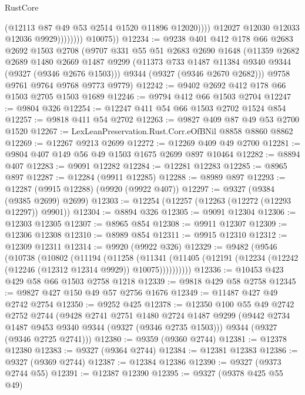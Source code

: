 \begin{lexlean}{RustCore}
\begin{coremodule}
                              (@12113 @87 @49 @53 @2514 @1520 @11896 @12020))))
                        @12027
                        @12030
                        @12033
                        @12036
                        @9929))))))))
        @10075))
@12234 := @9238
    @401
    @412
    @178
    @66
    @2683
    @2692
    @1503
    @2708
    (@9707
      @331
      @55
      @51
      @2683
      @2690
      @1648
      (@11359
        @2682
        @2689
        @1480
        @2669
        @1487
        @9299
        (@11373 @733 @1487 @11384 @9340 @9344 (@9327 (@9346 @2676 @1503)))
        @9344
        (@9327 (@9346 @2670 @2682)))
      @9758
      @9761
      @9764
      @9768
      @9773
      @9779)
@12242 := @9402 @2692 @412 @178 @66 @1503 @2705 @1503 @1689
@12246 := @9794 @412 @66 @1503 @2704
@12247 := @9804 @326
@12254 := @12247 @411 @54 @66 @1503 @2702 @1524 @854
@12257 := @9818 @411 @54 @2702
@12263 := @9827 @409 @87 @49 @53 @2700 @1520
@12267 := LexLeanPreservation.Rust.Corr.eOfBNil @8858 @8860 @8862
@12269 := @12267 @9213 @2699
@12272 := @12269 @409 @49 @2700
@12281 := @9804 @407 @149 @56 @49 @1503 @1675 @2699 @897 @10464
@12282 := @8894 @407
@12283 := @9091 @12282
@12284 := @12281 @12283
@12285 := @8965 @897
@12287 := @12284 (@9911 @12285)
@12288 := @8989 @897
@12293 := @12287 (@9915 @12288) (@9920 (@9922 @407))
@12297 := @9327 (@9384 (@9385 @2699) @2699)
@12303 := @12254 (@12257 (@12263 (@12272 (@12293 @12297)) @9901))
@12304 := @8894 @326
@12305 := @9091 @12304
@12306 := @12303 @12305
@12307 := @8965 @854
@12308 := @9911 @12307
@12309 := @12306 @12308
@12310 := @8989 @854
@12311 := @9915 @12310
@12312 := @12309 @12311
@12314 := @9920 (@9922 @326)
@12329 := @9482
    (@9546
      (@10738
        (@10802
          (@11194
            (@11258
              (@11341
                (@11405 (@12191 (@12234 (@12242 (@12246 (@12312 @12314 @9929)) @10075))))))))))
@12336 := @10453 @423 @429 @58 @66 @1503 @2758 @1218
@12339 := @9818 @429 @58 @2758
@12345 := @9827 @427 @150 @49 @57 @2756 @1676
@12349 := @11487 @427 @49 @2742 @2754
@12350 := @9252 @425
@12378 := @12350
    @100
    @55
    @49
    @2742
    @2752
    @2744
    (@9428
      @2741
      @2751
      @1480
      @2724
      @1487
      @9299
      (@9442 @2734 @1487 @9453 @9340 @9344 (@9327 (@9346 @2735 @1503)))
      @9344
      (@9327 (@9346 @2725 @2741)))
@12380 := @9359 (@9360 @2744)
@12381 := @12378 @12380
@12383 := @9327 (@9364 @2744)
@12384 := @12381 @12383
@12386 := @9327 (@9369 @2744)
@12387 := @12384 @12386
@12390 := @9327 (@9373 @2744 @55)
@12391 := @12387 @12390
@12395 := @9327 (@9378 @425 @55 @49)

\end{coremodule}
\end{lexlean}
